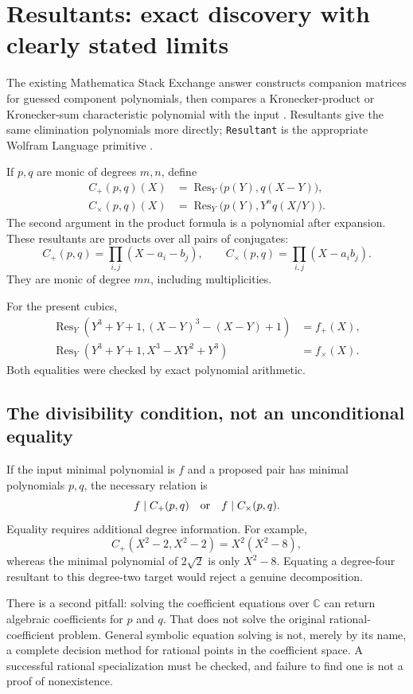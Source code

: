 \documentclass[11pt,a4paper]{article}
\newcommand{\C}{\mathbb C}
\newcommand{\Res}{\operatorname{Res}}
\newcommand{\code}[1]{\texttt{#1}}
\theoremstyle{remark}\newtheorem{remark}[theorem]{Remark}
\begin{document}
\section{Resultants: exact discovery with clearly stated limits}
\label{sec:resultants}
The existing Mathematica Stack Exchange answer constructs companion matrices for guessed component polynomials, then compares a Kronecker-product or Kronecker-sum characteristic polynomial with the input \cite{question}. Resultants give the same elimination polynomials more directly; \code{Resultant} is the appropriate Wolfram Language primitive \cite{resultant}.

If $p,q$ are monic of degrees $m,n$, define
\begin{align}
 C_+(p,q)(X)&=\Res_Y\bigl(p(Y),q(X-Y)\bigr),\\
 C_\times(p,q)(X)&=\Res_Y\bigl(p(Y),Y^nq(X/Y)\bigr).
 \label{eq:forwardres}
\end{align}
The second argument in the product formula is a polynomial after expansion. These resultants are products over all pairs of conjugates:
\[
 C_+(p,q)=\prod_{i,j}(X-a_i-b_j),\qquad
 C_\times(p,q)=\prod_{i,j}(X-a_i b_j).
\]
They are monic of degree $mn$, including multiplicities.

For the present cubics,
\begin{align}
 \Res_Y(Y^3+Y+1,(X-Y)^3-(X-Y)+1)&=f_+(X),\\
 \Res_Y(Y^3+Y+1,X^3-XY^2+Y^3)&=f_\times(X).
\end{align}
Both equalities were checked by exact polynomial arithmetic.

\subsection{The divisibility condition, not an unconditional equality}
If the input minimal polynomial is $f$ and a proposed pair has minimal polynomials $p,q$, the necessary relation is
\[
 f\mid C_+(p,q)\quad\hbox{or}\quad f\mid C_\times(p,q).
\]
Equality requires additional degree information. For example,
\[
 C_+(X^2-2,X^2-2)=X^2(X^2-8),
\]
whereas the minimal polynomial of $2\sqrt2$ is only $X^2-8$. Equating a degree-four resultant to this degree-two target would reject a genuine decomposition.

There is a second pitfall: solving the coefficient equations over $\C$ can return algebraic coefficients for $p$ and $q$. That does not solve the original rational-coefficient problem. General symbolic equation solving is not, merely by its name, a complete decision method for rational points in the coefficient space. A successful rational specialization must be checked, and failure to find one is not a proof of nonexistence.
\end{document}
